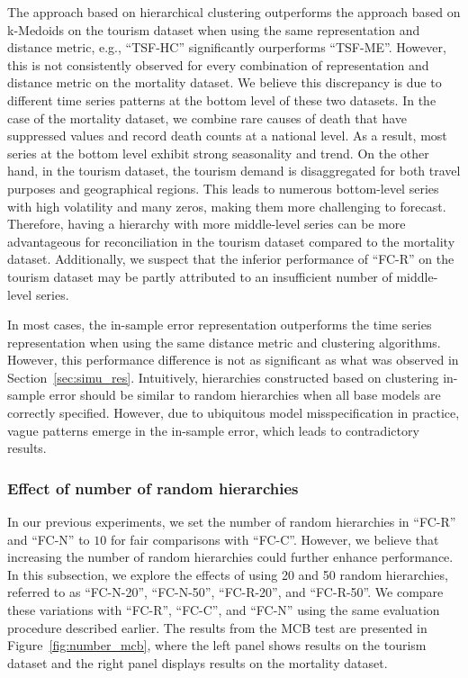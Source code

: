 \documentclass[a4paper,review,12pt,authoryear]{elsarticle}
\begin{document}
The approach based on hierarchical clustering outperforms the approach based on k-Medoids on the tourism dataset when using the same representation and distance metric, e.g., ``TSF-HC'' significantly ourperforms ``TSF-ME''. However, this is not consistently observed for every combination of representation and distance metric on the mortality dataset. We believe this discrepancy is due to different time series patterns at the bottom level of these two datasets.
In the case of the mortality dataset, we combine rare causes of death that have suppressed values and record death counts at a national level. As a result, most series at the bottom level exhibit strong seasonality and trend. On the other hand, in the tourism dataset, the tourism demand is disaggregated for both travel purposes and geographical regions. This leads to numerous bottom-level series with high volatility and many zeros, making them more challenging to forecast.
Therefore, having a hierarchy with more middle-level series can be more advantageous for reconciliation in the tourism dataset compared to the mortality dataset. Additionally, we suspect that the inferior performance of ``FC-R'' on the tourism dataset may be partly attributed to an insufficient number of middle-level series.

In most cases, the in-sample error representation outperforms the time series representation when using the same distance metric and clustering algorithms. However, this performance difference is not as significant as what was observed in Section~\ref{sec:simu_res}. Intuitively, hierarchies constructed based on clustering in-sample error should be similar to random hierarchies when all base models are correctly specified. However, due to ubiquitous model misspecification in practice, vague patterns emerge in the in-sample error, which leads to contradictory results.


\subsubsection*{Effect of number of random hierarchies}

In our previous experiments, we set the number of random hierarchies in ``FC-R'' and ``FC-N'' to $10$ for fair comparisons with ``FC-C''. However, we believe that increasing the number of random hierarchies could further enhance performance. In this subsection, we explore the effects of using 20 and 50 random hierarchies, referred to as ``FC-N-20'', ``FC-N-50'', ``FC-R-20'', and ``FC-R-50''. We compare these variations with ``FC-R'', ``FC-C'', and ``FC-N'' using the same evaluation procedure described earlier. The results from the MCB test are presented in Figure~\ref{fig:number_mcb}, where the left panel shows results on the tourism dataset and the right panel displays results on the mortality dataset.
\end{document}
